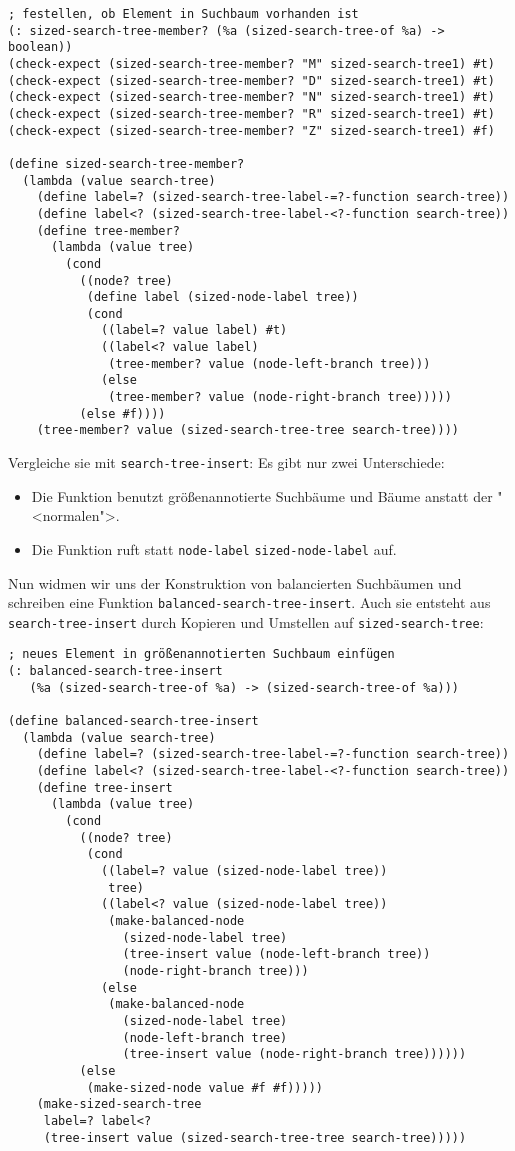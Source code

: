 \begin{lstlisting}
; festellen, ob Element in Suchbaum vorhanden ist
(: sized-search-tree-member? (%a (sized-search-tree-of %a) -> boolean))
(check-expect (sized-search-tree-member? "M" sized-search-tree1) #t)
(check-expect (sized-search-tree-member? "D" sized-search-tree1) #t)
(check-expect (sized-search-tree-member? "N" sized-search-tree1) #t)
(check-expect (sized-search-tree-member? "R" sized-search-tree1) #t)
(check-expect (sized-search-tree-member? "Z" sized-search-tree1) #f)

(define sized-search-tree-member?
  (lambda (value search-tree)
    (define label=? (sized-search-tree-label-=?-function search-tree))
    (define label<? (sized-search-tree-label-<?-function search-tree))
    (define tree-member?
      (lambda (value tree)
        (cond
          ((node? tree)
           (define label (sized-node-label tree))
           (cond
             ((label=? value label) #t)
             ((label<? value label)
              (tree-member? value (node-left-branch tree)))
             (else
              (tree-member? value (node-right-branch tree)))))
          (else #f))))
    (tree-member? value (sized-search-tree-tree search-tree))))
\end{lstlisting}
%
Vergleiche sie mit \lstinline{search-tree-insert}: Es gibt nur zwei
Unterschiede:
%
\begin{itemize}
\item Die Funktion benutzt größenannotierte Suchbäume und Bäume
  anstatt der "<normalen">.
\item Die Funktion ruft statt \lstinline{node-label} 
\lstinline{sized-node-label} auf.
\end{itemize}
%
Nun widmen wir uns der Konstruktion von balancierten Suchbäumen und
schreiben eine Funktion \lstinline{balanced-search-tree-insert}.  Auch
sie entsteht aus \lstinline{search-tree-insert} durch Kopieren und
Umstellen auf \lstinline{sized-search-tree}:
%
\begin{lstlisting}
; neues Element in größenannotierten Suchbaum einfügen
(: balanced-search-tree-insert
   (%a (sized-search-tree-of %a) -> (sized-search-tree-of %a)))

(define balanced-search-tree-insert
  (lambda (value search-tree)
    (define label=? (sized-search-tree-label-=?-function search-tree))
    (define label<? (sized-search-tree-label-<?-function search-tree))
    (define tree-insert
      (lambda (value tree)
        (cond
          ((node? tree)
           (cond
             ((label=? value (sized-node-label tree))
              tree)
             ((label<? value (sized-node-label tree))
              (make-balanced-node
                (sized-node-label tree)
                (tree-insert value (node-left-branch tree))
                (node-right-branch tree)))
             (else
              (make-balanced-node
                (sized-node-label tree)
                (node-left-branch tree)
                (tree-insert value (node-right-branch tree))))))
          (else
           (make-sized-node value #f #f)))))
    (make-sized-search-tree
     label=? label<?
     (tree-insert value (sized-search-tree-tree search-tree)))))
\end{lstlisting}
